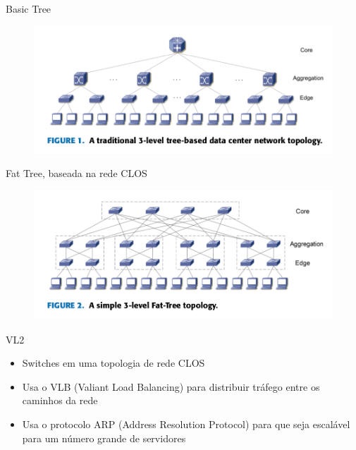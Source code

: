 \documentclass[aspectratio=169]{beamer}
\begin{document}
     \begin{frame} {Basic Tree}
            \begin{figure}[ht]    
                \includegraphics[scale=0.38]{basic_tree.png}
                
               
                \label{fig:consumo}
            \end{figure}

     
     \end{frame}
     
     
      \begin{frame} {Fat Tree, baseada na rede CLOS}
             \begin{figure}[ht]    
                 \includegraphics[scale=0.38]{fat_tree.png}
                 
                
                 \label{fig:consumo}
             \end{figure}
 
      
      \end{frame}
      
       \begin{frame} {VL2}


         \begin{itemize}
             \Large
             \item
                 Switches em uma topologia de rede CLOS
         
             \item
                 Usa o VLB (Valiant Load Balancing) para distribuir tráfego entre os caminhos da rede
         
              \item
                 Usa o protocolo ARP (Address Resolution Protocol) para que seja escalável para um número grande de servidores
                         
              
         \end{itemize}
  
       
       \end{frame}
    
\end{document}
